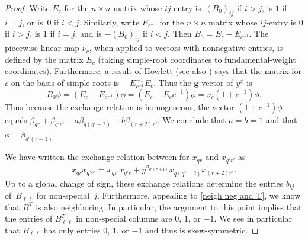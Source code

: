 \documentclass{amsart}
\theoremstyle{definition}
\theoremstyle{remark}
\numberwithin{equation}{section}
\newcommand{\0}{{\mathbf{0}}}
\newcommand{\g}{\mathbf{g}}
\begin{document}
\begin{proof}
Write $E_c$ for the $n\times n$ matrix whose $ij$-entry is~$(B_0)_{ij}$ if $i>j$, is $1$ if $i=j$, or is~$0$ if $i<j$.
Similarly, write $E_{c^{-1}}$ for the $n\times n$ matrix whose $ij$-entry is $0$ if $i>j$, is $1$ if $i=j$, and is $-(B_0)_{ij}$ if $i<j$.
Then $B_0=E_c-E_{c^{-1}}$.
The piecewise linear map $\nu_c$, when applied to vectors with nonnegative entries, is defined by the matrix $E_c$ (taking simple-root coordinates to fundamental-weight coordinates).
Furthermore, a result of Howlett \cite[Theorem~2.1]{Howlett} (see also \cite[Theorem~2.6]{affdenom}) says that the matrix for $c$ on the basis of simple roots is~$-E_{c^{-1}}^{-1}E_c$.
Thus the $\g$-vector of $y^\phi$ is 
\[B_0\phi=(E_c-E_{c^{-1}})\phi=(E_c+E_cc^{-1})\phi=\nu_c(1+c^{-1})\phi.\]
Thus because the exchange relation is homogeneous, the vector $(1+c^{-1})\phi$ equals $\beta_{qr}+\beta_{q'r'}-a\beta_{q(q'-2)}-b\beta_{(r+2)r'}$.
We conclude that $a=b=1$ and that $\phi=\beta_{q'(r+1)}$.

We have written the exchange relation between for $x_{qr}$ and $x_{q'r'}$ as 
\begin{equation}\label{exch rel eq}
x_{qr}x_{q'r'}=x_{qr'}x_{q'r}+y^{\beta_{q'(r+1)}}x_{q(q'-2)}x_{(r+2)r'}.
\end{equation}
Up to a global change of sign, these exchange relations determine the entries $b_{ij}$ of~$B_{\ell\ell}$ for non-special~$j$.
Furthermore, appealing to \cref{neigh neg and T}, we know that $B^T$ is also neighboring.
In particular, the argument to this point implies that the entries of $B_{\ell\ell}^T$ in non-special columns are $0$, $1$, or $-1$.
We see in particular that $B_{\ell\ell}$ has only entries $0$, $1$, or $-1$ and thus is skew-symmetric. %


\end{proof}
\end{document}
